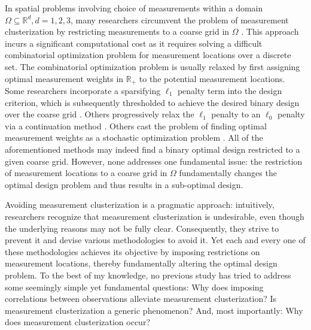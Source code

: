 \documentclass[ba]{imsart}
\theoremstyle{plain}
\theoremstyle{definition}
\theoremstyle{remark}
\begin{document}
In spatial problems involving choice of measurements within a domain
\(\Omega \subseteq \mathbb{R}^d, d=1,2,3\), many researchers
circumvent the problem of measurement clusterization by restricting
measurements to a coarse grid in \(\Omega\) \cite{koval2020,
  alexanderian2021, attia2022, alexanderian2014, alexanderian2016,
  alexanderian2018efficient, brunton2016}. This approach incurs a
significant computational cost as it requires solving a difficult
combinatorial optimization problem for measurement locations over a
discrete set. The combinatorial optimization problem is usually
relaxed by first assigning optimal measurement weights in
\(\mathbb{R}_+\) to the potential measurement locations. Some
researchers incorporate a sparsifying \(\ell_1\) penalty term into the
design criterion, which is subsequently thresholded to achieve the
desired binary design over the coarse grid
\cite{horesh2008borehole}. Others progressively relax the \(\ell_1\)
penalty to an \(\ell_0\) penalty via a continuation method
\cite{alexanderian2016, alexanderian2014}. Others cast the problem of
finding optimal measurement weights as a stochastic optimization
problem \cite{attia2022stochastic}. All of the aforementioned methods
may indeed find a binary optimal design restricted to a given coarse
grid. However, none addresses one fundamental issue: the restriction
of measurement locations to a coarse grid in \(\Omega\) fundamentally
changes the optimal design problem and thus results in a sub-optimal
design.

Avoiding measurement clusterization is a pragmatic approach:
intuitively, researchers recognize that measurement clusterization is
undesirable, even though the underlying reasons may not be fully
clear. Consequently, they strive to prevent it and devise various
methodologies to avoid it. Yet each and every one of these
methodologies achieves its objective by imposing restrictions on
measurement locations, thereby fundamentally altering the optimal
design problem. To the best of my knowledge, no previous study has
tried to address some seemingly simple yet fundamental questions:
Why does imposing correlations between observations alleviate
measurement clusterization?
Is measurement clusterization a generic phenomenon? 
And, most importantly: Why does measurement clusterization occur?
\end{document}
